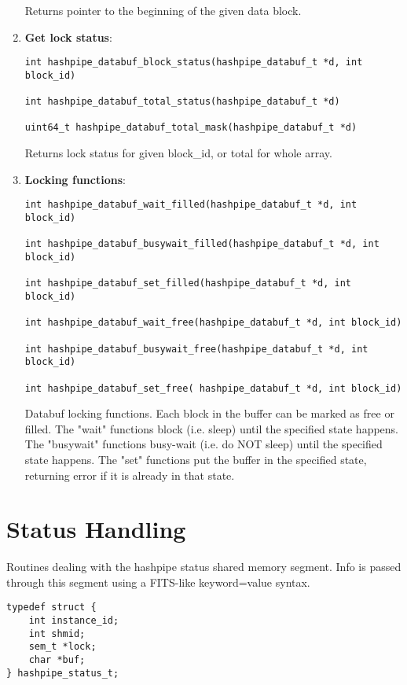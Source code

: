 \documentclass[12pt]{article}
\begin{document}
\begin{enumerate}
Returns pointer to the beginning of the given data block.

\item {\bf Get lock status}:

\begin{lstlisting}
int hashpipe_databuf_block_status(hashpipe_databuf_t *d, int block_id)

int hashpipe_databuf_total_status(hashpipe_databuf_t *d)

uint64_t hashpipe_databuf_total_mask(hashpipe_databuf_t *d)
\end{lstlisting}

Returns lock status for given block\_id, or total for whole array.

\item {\bf Locking functions}:

\begin{lstlisting}
int hashpipe_databuf_wait_filled(hashpipe_databuf_t *d, int block_id)

int hashpipe_databuf_busywait_filled(hashpipe_databuf_t *d, int block_id)

int hashpipe_databuf_set_filled(hashpipe_databuf_t *d, int block_id)

int hashpipe_databuf_wait_free(hashpipe_databuf_t *d, int block_id)

int hashpipe_databuf_busywait_free(hashpipe_databuf_t *d, int block_id)

int hashpipe_databuf_set_free( hashpipe_databuf_t *d, int block_id)
\end{lstlisting}

Databuf locking functions.  Each block in the buffer
can be marked as free or filled.  The "wait" functions
block (i.e. sleep) until the specified state happens.
The "busywait" functions busy-wait (i.e. do NOT sleep)
until the specified state happens.  The "set" functions
put the buffer in the specified state, returning error if
it is already in that state.

\end{enumerate}

\section{Status Handling}
Routines dealing with the hashpipe status shared memory
segment.  Info is passed through this segment using
a FITS-like keyword=value syntax.

\begin{centering}
\begin{lstlisting}
typedef struct {
    int instance_id;
    int shmid;
    sem_t *lock;
    char *buf; 
} hashpipe_status_t;
\end{lstlisting}
\end{centering}
\end{document}
